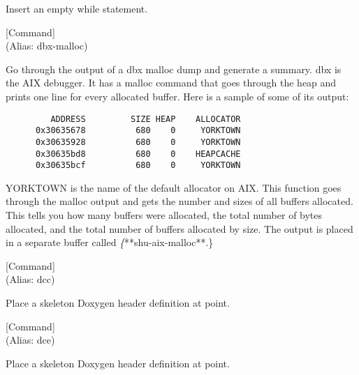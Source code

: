 \begin{doc-string}
Insert an empty while statement.
\end{doc-string}

\vspace{1em}
\noindent
{}
\usebox{\funcname}
 \hfill [Command]\\%
 (Alias: dbx-malloc)

\begin{doc-string}
Go through the output of a dbx malloc dump and generate a summary.  dbx is
the AIX debugger.  It has a malloc command that goes through the heap and prints
one line for every allocated buffer.  Here is a sample of some of its output:

\small{\begin{verbatim}
         ADDRESS         SIZE HEAP    ALLOCATOR
      0x30635678          680    0     YORKTOWN
      0x30635928          680    0     YORKTOWN
      0x30635bd8          680    0    HEAPCACHE
      0x30635bcf          680    0     YORKTOWN
\end{verbatim}}

YORKTOWN is the name of the default allocator on AIX.  This function goes
through the malloc output and gets the number and sizes of all buffers
allocated.  This tells you how many buffers were allocated, the total number of
bytes allocated, and the total number of buffers allocated by size.  The output
is placed in a separate buffer called \emph\{**shu-aix-malloc**.\}
\end{doc-string}

\vspace{1em}
\noindent
{}
\usebox{\funcname}
 \hfill [Command]\\%
 (Alias: dcc)

\begin{doc-string}
Place a skeleton Doxygen header definition at point.
\end{doc-string}

\vspace{1em}
\noindent
{}
\usebox{\funcname}
 \hfill [Command]\\%
 (Alias: dce)

\begin{doc-string}
Place a skeleton Doxygen header definition at point.
\end{doc-string}


